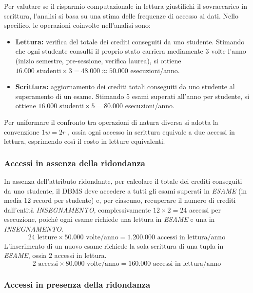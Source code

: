 \noindent
Per valutare se il risparmio computazionale in lettura 
giustifichi il sovraccarico in scrittura, 
l'analisi si basa su una stima delle frequenze di accesso ai dati.
Nello specifico, le operazioni coinvolte nell'analisi sono:
\begin{itemize}
    \item \textbf{Lettura:} verifica del totale dei crediti conseguiti da uno studente. 
    Stimando che ogni studente consulti il proprio stato 
    carriera mediamente 3 volte l'anno (inizio semestre, pre-sessione, verifica laurea), 
    si ottiene $16.000 \text{ studenti} \times 3 = 48.000 \approx 50.000$ esecuzioni/anno.
    \item \textbf{Scrittura:} aggiornamento dei crediti totali conseguiti da uno studente al superamento di un esame.  
    Stimando 5 esami superati all'anno per studente, si ottiene 
    $16.000 \text{ studenti} \times 5 = 80.000$ esecuzioni/anno.
\end{itemize}

\noindent
Per uniformare il confronto tra operazioni di natura diversa si adotta la convenzione $1w = 2r$ , 
ossia ogni accesso in scrittura equivale a due accessi in lettura, 
esprimendo così il costo in letture equivalenti.

\subsubsection{Accessi in assenza della ridondanza}

In assenza dell'attributo ridondante, per calcolare il totale dei 
crediti conseguiti da uno studente, il DBMS deve accedere a tutti 
gli esami superati in \textit{ESAME} (in media 12 record per studente) 
e, per ciascuno, recuperare il numero di crediti 
dall'entità \textit{INSEGNAMENTO}, complessivamente 
$12 \times 2 = 24$ accessi per esecuzione,
poiché ogni esame richiede una lettura in \textit{ESAME} 
e una in \textit{INSEGNAMENTO}.
$$24 \text{ letture} \times 50.000 \text{ volte/anno} = 1.200.000 \text{ accessi in lettura/anno}$$
L'inserimento di un nuovo esame richiede la sola scrittura 
di una tupla in \textit{ESAME}, ossia 2 accessi in lettura.
$$2 \text{ accessi} \times 80.000 \text{ volte/anno} = 160.000 \text{ accessi in lettura/anno}$$

\subsubsection{Accessi in presenza della ridondanza}

